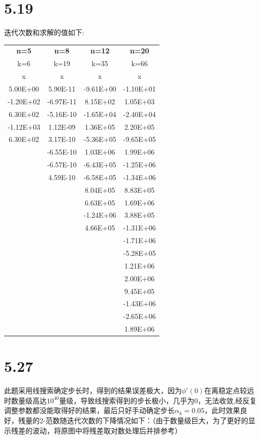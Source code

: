 \section{5.19}
迭代次数和求解的值如下:
\begin{table}[htbp]
  \centering
    \begin{tabular}{cccc}
    \rowcolor{gray!50}
    \textbf{n=5} & \textbf{n=8} & \textbf{n=12} & \textbf{n=20} \\
    \rowcolor{lightgray!50}
    k=6   & k=19  & k=35  & k=66 \\
    \rowcolor{gray!50}
    x     & x     & x     & x \\
    5.00E+00 & 5.90E-11 & -9.61E+00 & -1.10E+01 \\
    -1.20E+02 & -6.97E-11 & 8.15E+02 & 1.05E+03 \\
    6.30E+02 & -5.16E-10 & -1.65E+04 & -2.40E+04 \\
    -1.12E+03 & 1.12E-09 & 1.36E+05 & 2.20E+05 \\
    6.30E+02 & 3.17E-10 & -5.36E+05 & -9.65E+05 \\
          & -6.55E-10 & 1.03E+06 & 1.99E+06 \\
          & -6.57E-10 & -6.43E+05 & -1.25E+06 \\
          & 4.59E-10 & -6.58E+05 & -1.34E+06 \\
          &       & 8.04E+05 & 8.83E+05 \\
          &       & 6.63E+05 & 1.69E+06 \\
          &       & -1.24E+06 & 3.88E+05 \\
          &       & 4.66E+05 & -1.31E+06 \\
          &       &       & -1.71E+06 \\
          &       &       & -5.28E+05 \\
          &       &       & 1.21E+06 \\
          &       &       & 2.00E+06 \\
          &       &       & 9.45E+05 \\
          &       &       & -1.43E+06 \\
          &       &       & -2.65E+06 \\
          &       &       & 1.89E+06 \\
    \end{tabular}%
  \label{tab:addlabel}%
\end{table}%

\section{5.27}
此题采用线搜索确定步长时，得到的结果误差极大，因为$\phi'(0)$在离稳定点较远时数量级高达$10^{40}$量级，导致线搜索得到的步长极小，几乎为0，无法收敛,经反复调整参数都没能取得好的结果，最后只好手动确定步长$\alpha_k=0.05$，此时效果良好，残量的2-范数随迭代次数的下降情况如下：（由于数量级巨大，为了更好的显示残差的波动，将原图中将残差取对数处理后并排参考）

